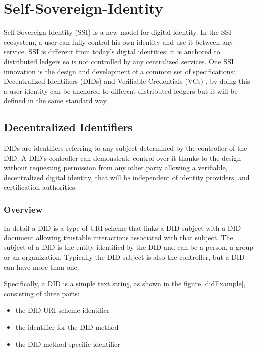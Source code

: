 
\section{Self-Sovereign-Identity}
Self-Sovereign Identity (SSI) \cite{tobin2016inevitable} is a new model for digital identity. In the SSI ecosystem, a user can fully control his own identity and use it between any service. SSI is different from today's digital identities: it is anchored to distributed ledgers so is not controlled by any centralized services.
One SSI innovation is the design and development of a common set of specifications: 
Decentralized Identifiers (DIDs) \cite{didW3C} and Verifiable Credentials (VCs) \cite{vcW3C}, by doing this a user identity can be anchored to different distributed ledgers but it will be defined in the same standard way.

\subsection{Decentralized Identifiers}  
DIDs \cite{didW3C} are identifiers referring to any subject determined by the controller of the DID.
A DID's controller can demonstrate control over it thanks to the design without requesting permission from any other party allowing a verifiable, decentralized digital identity, that will be independent of identity providers, and certification authorities.

\subsubsection*{Overview}

In detail a DID is a type of URI \cite{berners2005uniform} scheme that links a DID subject with a DID document allowing trustable interactions associated with that subject. The subject of a DID is the entity identified by the DID and can be a person, a group or an organization. Typically the DID subject is also the controller, but a DID can have more than one. 

Specifically, a DID is a simple text string, as shown in the figure \ref{didExample}, consisting of three parts: 
\begin{itemize}
    \item the DID URI scheme identifier
    \item the identifier for the DID method
    \item the DID method-specific identifier
\end{itemize}

